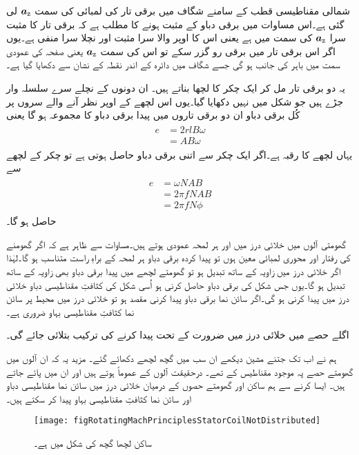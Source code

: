 شمالی مقناطیسی قطب کے سامنے شگاف میں برقی تار کی لمبائی کی سمت ${\boldsymbol{a}}_{\textup{z}}$ لی گئی ہے۔اس مساوات میں برقی دباو کے مثبت ہونے کا مطلب ہے کہ برقی تار کا مثبت سرا ${\boldsymbol{a}}_{\textup{z}}$ کی سمت میں ہے یعنی اس کا اوپر والا سرا مثبت اور نچلا  سرا منفی ہے۔یوں اگر اس برقی تار میں برقی رو گزر سکے تو اس کی سمت ${\boldsymbol{a}}_{\textup{z}}$ یعنی صفحہ کی عمودی سمت میں باہر کی جانب ہو گی جسے شگاف میں دائرہ کے اندر نقطہ کے نشان سے دکھایا گیا ہے۔ 

یہ دو برقی تار مل کر ایک چکر کا لچھا بناتے ہیں۔ ان دونوں کے نچلے سرے سلسلہ وار جڑے ہیں جو شکل میں نہیں دکھایا گیا۔یوں اس لچھے کے اوپر نظر آنے والے سروں پر کُل برقی دباو  ان دو برقی تاروں میں پیدا برقی دباو  کا مجموعہ ہو گا یعنی
\begin{gather}
\begin{aligned}
e&=2r l B \omega\\
&=A B \omega
\end{aligned}
\end{gather}
یہاں لچھے کا رقبہ   ہے۔اگر ایک چکر سے اتنی برقی دباو حاصل ہوتی ہے تو  چکر کے لچھے  سے
\begin{gather}
\begin{aligned}\label{مساوات_گھومتے_مشین_پیدا_دباو}
e&=\omega N A B\\
&=2 \pi f N A B\\
&=2 \pi f N \phi
\end{aligned}
\end{gather}
حاصل ہو گا۔

گھومتی آلوں میں خلائی درز میں   اور   ہر لمحہ عمودی ہوتے ہیں۔مساوات   سے ظاہر ہے کہ اگر گھومنے کی رفتار اور محوری لمبائی معین ہوں تو پیدا کردہ برقی دباو  ہر لمحہ   کے براہِ راست متناسب ہو گا۔لہٰذا اگر خلائی درز میں زاویہ کے ساتھ   تبدیل ہو تو گھومتے لچھے میں پیدا برقی دباو بھی زاویہ کے ساتھ تبدیل ہو گا۔یوں جس شکل کی برقی دباو حاصل کرنی ہو اُسی شکل کی کثافتِ مقناطیسی دباو خلائی درز میں پیدا کرنی ہو گی۔اگر سائن نما برقی دباو پیدا کرنی مقصد ہو تو خلائی درز میں محیط پر سائن نما کثافتِ مقناطیسی بہاو ضروری ہے۔

اگلے حصے میں خلائی درز میں ضرورت کے تحت   پیدا کرنے کی ترکیب بتلائی جائے گی۔

ہم نے اب تک جتنے مشین دیکھے ان سب میں گچھ لچھے دکھائے گئے۔ مزید یہ کہ ان آلوں میں گھومتے حصے پہ موجود مقناطیس کے  تھے۔ درحقیقت آلوں کے عموماً  ہوتے ہیں اور ان میں  پائے جاتے ہیں۔ ایسا کرنے سے ہم ساکن اور گھومتے حصوں کے درمیان خلائی درز میں سائن نما مقناطیسی دباو اور سائن نما  کثافتِ مقناطیسی بہاو پیدا کر سکتے ہیں۔ 
\begin{figure}
\centering
\texttt{[image: figRotatingMachPrinciplesStatorCoilNotDistributed]}
\caption{ساکن لچھا گچھ کی شکل میں ہے۔}
\label{شکل_گھومتے_مشین_گچھ_لچھا}
\end{figure}

